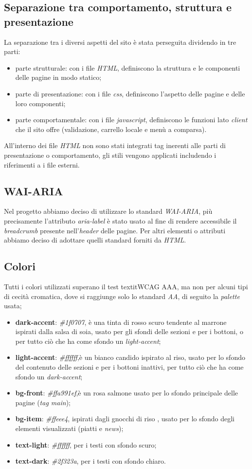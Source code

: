 \documentclass{template}
\begin{document}
	\subsection{Separazione tra comportamento, struttura e presentazione}
	La separazione tra i diversi aspetti del sito è stata perseguita dividendo in tre parti:
	\begin{itemize}
		\item parte strutturale: con i file \textit{HTML}, definiscono la struttura e le componenti delle pagine in modo statico; 
		\item parte di presentazione: con i file \textit{css}, definiscono l'aspetto delle pagine e delle loro componenti;
		\item parte comportamentale: con i file \textit{javascript}, definiscono le funzioni lato \textit{client} che il sito offre (validazione, carrello locale e menù a comparsa).
	\end{itemize}
	All'interno dei file \textit{HTML} non sono stati integrati tag inerenti alle parti di presentazione o comportamento, gli stili vengono applicati includendo i riferimenti a i file esterni.
	
	\subsection{WAI-ARIA}
	Nel progetto abbiamo deciso di utilizzare lo standard \textit{WAI-ARIA}, più precisamente l'attributo \textit{aria-label} è stato usato al fine di rendere accessibile il \textit{breadcrumb} presente nell'\textit{header} delle pagine.
	Per altri elementi o attributi abbiamo deciso di adottare quelli standard forniti da \textit{HTML}.

	\subsection{Colori}
	Tutti i colori utilizzati superano il test textit{WCAG AAA}, ma non per alcuni tipi di cecità cromatica, dove si raggiunge solo lo standard \textit{AA}, di seguito la \textit{palette} usata;
	\begin{itemize}
		\item \textbf{dark-accent}: \textit{\#1f0707}, è una tinta di rosso scuro tendente al marrone ispirati dalla salsa di soia, usato per gli sfondi delle sezioni e per i bottoni, o per tutto ciò che ha come sfondo un \textit{light-accent};
		\item \textbf{light-accent}: \textit{\#ffffff},è un bianco candido ispirato al riso, usato per lo sfondo del contenuto delle sezioni e per i bottoni inattivi, per tutto ciò che ha come sfondo un \textit{dark-accent};
		\item \textbf{bg-front}: \textit{\#ffa991ef},è un rosa salmone usato per lo sfondo principale delle pagine (\textit{tag main});
		\item \textbf{bg-item}: \textit{\#ffeee4}, ispirati dagli gnocchi di riso , usato per lo sfondo degli elementi visualizzati (piatti e \textit{news});
		\item \textbf{text-light}: \textit{\#ffffff}, per i testi con sfondo scuro;
		\item \textbf{text-dark}: \textit{\#2f323a}, per i testi con sfondo chiaro.
	\end{itemize}
\end{document}

